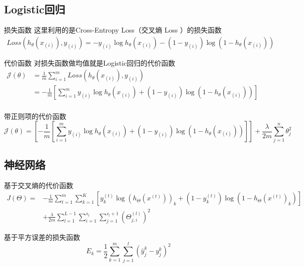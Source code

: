 \subsection{Logistic回归}
\begin{outline}
	
	\1 损失函数
	\2 这里利用的是Cross-Entropy Loss（交叉熵 Loss ）的损失函数
\begin{equation}\label{eq:4}
	\begin{aligned}
		Loss(h_{\theta}(x_{(i)}),y_{(i)})=-y_{(i)}\log h_{\theta}(x_{(i)})-(1-y_{(i)})\log(1-h_{\theta}(x_{(i)}))
	\end{aligned}
\end{equation}

\1 代价函数
\2 对损失函数做均值就是Logistic回归的代价函数
\begin{equation}\label{eq:5}
	\begin{aligned}
		\mathcal{J} (\theta )
		&=\frac{1}{m}\sum_{i=1}^{m}Loss(h_{\theta}(x_{(i)}),y_{(i)})\\
		&=-\frac{1}{m}[\sum_{i = 1}^{m}y_{(i)}\log h_{\theta}(x_{(i)})+(1-y_{(i)})\log(1-h_{\theta}(x_{(i)}))]\\
	\end{aligned}
\end{equation}

\1 带正则项的代价函数
\begin{equation}\label{eq:6}
		\mathcal{J} (\theta )=[-\frac{1}{m}[\sum_{i = 1}^{m}y_{(i)}\log h_{\theta}(x_{(i)})+(1-y_{(i)})\log(1-h_{\theta}(x_{(i)}))]]+\frac{\lambda }{2m}\sum_{j = 1}^{n} \theta_{j}^{2}
\end{equation}

\end{outline}



\subsection{神经网络}
\begin{outline}
	\1 基于交叉熵的代价函数
	\begin{equation}\label{eq:7}
		\begin{aligned}
		J(\Theta)=&-\frac{1}{m} \sum_{t=1}^{m} \sum_{k=1}^{K}\left[y_{k}^{(t)} \log \left(h_{\Theta}\left(x^{(t)}\right)\right)_{k}+\left(1-y_{k}^{(t)}\right) \log \left(1-h_{\Theta}\left(x^{(t)}\right)_{k}\right)\right]\\
		&+\frac{\lambda}{2 m} \sum_{l=1}^{L-1} \sum_{i=1}^{s_{l}} \sum_{j=1}^{s_{l}+1}\left(\Theta_{j, i}^{(l)}\right)^{2}
	\end{aligned}
	\end{equation}

	\1 基于平方误差的损失函数
	\begin{equation}\label{eq:8}
		E_{k}=\frac{1}{2} \sum_{k=1}^{m} \sum_{j=1}^{l}\left(\hat{y}_{j}^{k}-y_{j}^{k}\right)^{2}
	\end{equation}

\end{outline}




